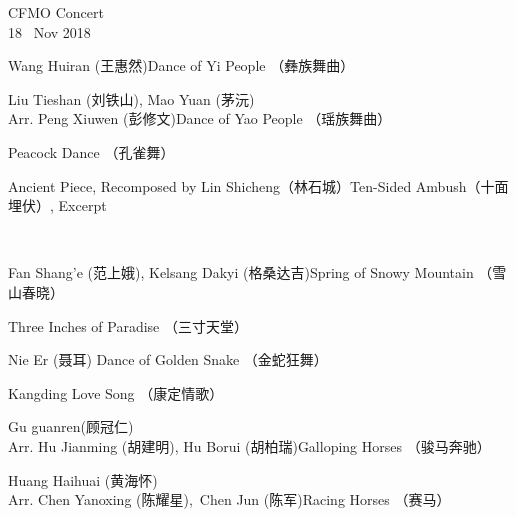 \documentclass[letter,6pt,poets]{ConcProg}
\begin{document}
\begin{programme}{
    CFMO Concert
\\  {\normalsize 18 ~Nov 2018}
}
\begin{part}[]
    \begin{composition}{Wang Huiran (王惠然)}{}{Dance of Yi People  （彝族舞曲）}{}
                   {}{}
    \end{composition}
    \begin{composition}{Liu Tieshan (刘铁山), Mao Yuan (茅沅) \\Arr. Peng Xiuwen (彭修文)}{}{Dance of Yao People  （瑶族舞曲）}{}
    \end{composition}
    \begin{composition}{}{}{Peacock Dance （孔雀舞） }{}
                   {}{}
    \end{composition}
    \begin{composition}{Ancient Piece, Recomposed by Lin Shicheng（林石城）}{}{Ten-Sided Ambush（十面埋伏）, Excerpt}{}
    \end{composition}\\
    \begin{composition}{Fan Shang'e (范上娥), Kelsang Dakyi (格桑达吉)}{}{Spring of Snowy Mountain   （雪山春晓）}{}
                   {}{}
    \end{composition}
    \begin{composition}{}{}{Three Inches of Paradise  （三寸天堂）}{}
    \end{composition}
    \begin{composition}{Nie Er (聂耳)} {}{Dance of Golden Snake  （金蛇狂舞）}{}
    \end{composition}
    \begin{composition}{}{}{Kangding Love Song  （康定情歌）}{}
    \end{composition}
    \begin{composition}{Gu guanren(顾冠仁)\\ Arr. Hu Jianming (胡建明), Hu Borui (胡柏瑞)}{}{Galloping Horses  （骏马奔驰）}{}
    \end{composition}
    \begin{composition}{Huang Haihuai (黄海怀)\\ Arr. Chen Yanoxing (陈耀星),\  Chen Jun (陈军)}{}{Racing Horses  （赛马）}{}

\end{composition}
\end{part}
\end{programme}
\end{document}
